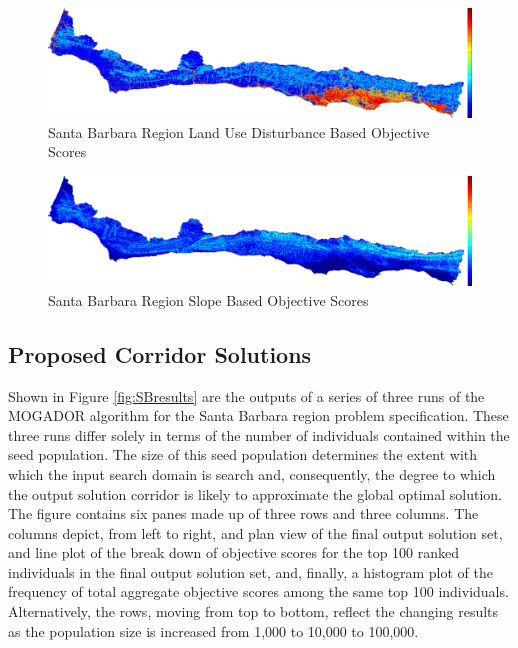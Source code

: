         \begin{figure}[!h]
            \begin{center}
            \includegraphics[width=5.5in]{figures/SantaBarbara_DisturbanceScore.png}   
            \caption{Santa Barbara Region Land Use Disturbance Based Objective Scores}
            \label{fig:SBdisturbance}
            \end{center}
        \end{figure}
        
        \begin{figure}[!h]
            \begin{center}
            \includegraphics[width=5.5in]{figures/SantaBarbara_SlopeScore.png}   
            \caption{Santa Barbara Region Slope Based Objective Scores}
            \label{fig:SBslope}
            \end{center}
        \end{figure}
        
    \subsection{Proposed Corridor Solutions}
    
Shown in Figure \ref{fig:SBresults} are the outputs of a series of three runs of the MOGADOR algorithm for the Santa Barbara region problem specification. These three runs differ solely in terms of the number of individuals contained within the seed population. The size of this seed population determines the extent with which the input search domain is search and, consequently, the degree to which the output solution corridor is likely to approximate the global optimal solution. The figure contains six panes made up of three rows and three columns. The columns depict, from left to right, and plan view of the final output solution set, and line plot of the break down of objective scores for the top 100 ranked individuals in the final output solution set, and, finally, a histogram plot of the frequency of total aggregate objective scores among the same top 100 individuals. Alternatively, the rows, moving from top to bottom, reflect the changing results as the population size is increased from 1,000 to 10,000 to 100,000. 

